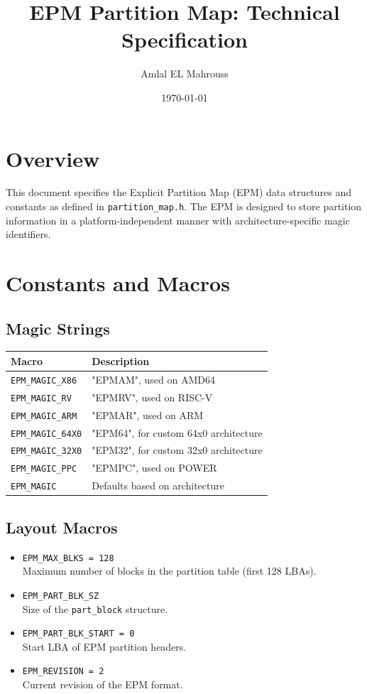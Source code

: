 \documentclass[12pt]{article}
\title{EPM Partition Map: Technical Specification}
\author{Amlal EL Mahrouss}
\date{\today}
\begin{document}
\maketitle

\section{Overview}
This document specifies the Explicit Partition Map (EPM) data structures and constants as defined in \texttt{partition\_map.h}. The EPM is designed to store partition information in a platform-independent manner with architecture-specific magic identifiers.

\section{Constants and Macros}

\subsection{Magic Strings}
\begin{longtable}{|l|l|}
\hline
\textbf{Macro} & \textbf{Description} \\
\hline
\texttt{EPM\_MAGIC\_X86} & "EPMAM", used on AMD64 \\
\texttt{EPM\_MAGIC\_RV} & "EPMRV", used on RISC-V \\
\texttt{EPM\_MAGIC\_ARM} & "EPMAR", used on ARM \\
\texttt{EPM\_MAGIC\_64X0} & "EPM64", for custom 64x0 architecture \\
\texttt{EPM\_MAGIC\_32X0} & "EPM32", for custom 32x0 architecture \\
\texttt{EPM\_MAGIC\_PPC} & "EPMPC", used on POWER \\
\texttt{EPM\_MAGIC} & Defaults based on architecture \\
\hline
\end{longtable}

\subsection{Layout Macros}
\begin{itemize}
  \item \texttt{EPM\_MAX\_BLKS = 128} \\
  Maximum number of blocks in the partition table (first 128 LBAs).
  \item \texttt{EPM\_PART\_BLK\_SZ} \\
  Size of the \texttt{part\_block} structure.
  \item \texttt{EPM\_PART\_BLK\_START = 0} \\
  Start LBA of EPM partition headers.
  \item \texttt{EPM\_REVISION = 2} \\
  Current revision of the EPM format.
\end{itemize}
\end{document}
